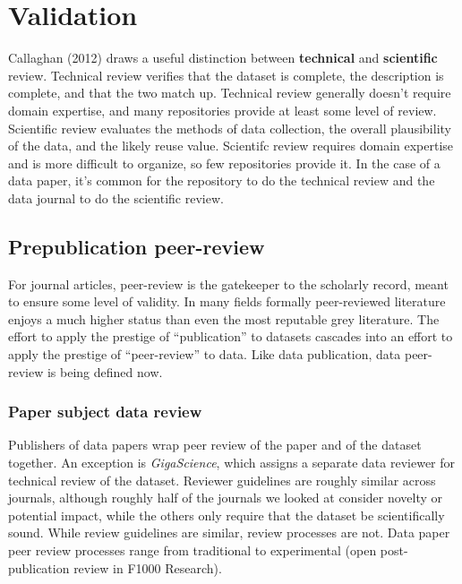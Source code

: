 \documentclass[10pt,twocolumn]{article}
\begin{document}
\section*{Validation}\label{trustworthiness}

Callaghan (2012)\cite{sarah_callaghan_making_2012} draws a useful distinction between \textbf{technical} and \textbf{scientific} review. 
Technical review verifies that the dataset is complete, the description is complete, and that the two match up.  
Technical review generally doesn't require domain expertise, and many repositories provide at least some level of review. 
Scientific review evaluates the methods of data collection, the overall plausibility of the data, and the likely reuse value. 
Scientifc review requires domain expertise and is more difficult to organize, so few repositories provide it.
In the case of a data paper, it's common for the repository to do the technical review and the data journal to do the scientific review.

\subsection*{Prepublication peer-review}

For journal articles, peer-review is the gatekeeper to the scholarly record, meant to ensure some level of validity.
In many fields formally peer-reviewed literature enjoys a much higher status than even the most reputable grey literature.
The effort to apply the prestige of ``publication'' to datasets cascades into an effort to apply the prestige of ``peer-review'' to data.
Like data publication, data peer-review is being defined now.

\subsubsection*{Paper subject data review}
Publishers of data papers wrap peer review of the paper and of the dataset together. 
An exception is \emph{GigaScience}, which assigns a separate data reviewer for technical review of the dataset. 
Reviewer guidelines are roughly similar across journals, although roughly half of the journals we looked at consider novelty or potential impact, while the others only require that the dataset be scientifically sound.
While review guidelines are similar, review processes are not. 
Data paper peer review processes range from traditional to experimental (open post-publication review in F1000 Research).
\end{document}
